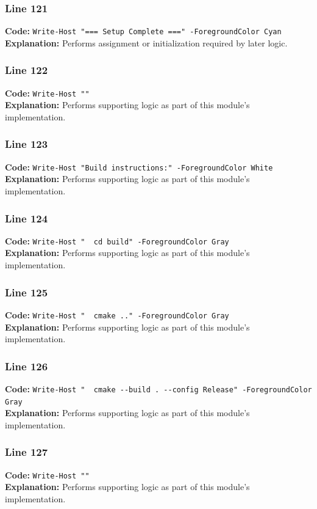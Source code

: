 \documentclass[11pt,a4paper]{article}
\begin{document}
\subsubsection*{Line 121}
\textbf{Code:} \verb|Write-Host "=== Setup Complete ===" -ForegroundColor Cyan|\\
\textbf{Explanation:} Performs assignment or initialization required by later logic.

\subsubsection*{Line 122}
\textbf{Code:} \verb|Write-Host ""|\\
\textbf{Explanation:} Performs supporting logic as part of this module's implementation.

\subsubsection*{Line 123}
\textbf{Code:} \verb|Write-Host "Build instructions:" -ForegroundColor White|\\
\textbf{Explanation:} Performs supporting logic as part of this module's implementation.

\subsubsection*{Line 124}
\textbf{Code:} \verb|Write-Host "  cd build" -ForegroundColor Gray|\\
\textbf{Explanation:} Performs supporting logic as part of this module's implementation.

\subsubsection*{Line 125}
\textbf{Code:} \verb|Write-Host "  cmake .." -ForegroundColor Gray|\\
\textbf{Explanation:} Performs supporting logic as part of this module's implementation.

\subsubsection*{Line 126}
\textbf{Code:} \verb|Write-Host "  cmake --build . --config Release" -ForegroundColor Gray|\\
\textbf{Explanation:} Performs supporting logic as part of this module's implementation.

\subsubsection*{Line 127}
\textbf{Code:} \verb|Write-Host ""|\\
\textbf{Explanation:} Performs supporting logic as part of this module's implementation.
\end{document}
